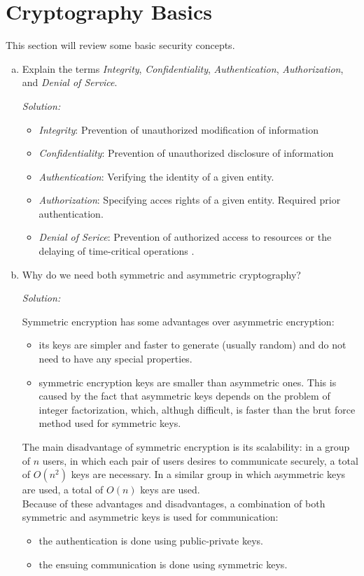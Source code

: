 \documentclass[a4paper,11pt]{article}
\newcommand{\includeonlyinsolution}[1]{\ifsolution#1\fi}
\newenvironment{solution}%
{\par{\noindent\small\textit{Solution:}}\vspace{-12pt}\begin{framed}}%
{\end{framed}\par}
\begin{document}
\section{Cryptography Basics}
This section will review some basic security concepts.
\begin{enumerate}[(a)]
\item Explain the terms \emph{Integrity}, \emph{Confidentiality},
  \emph{Authentication}, \emph{Authorization}, and 
  \emph{Denial of Service}.
\includeonlyinsolution{\begin{solution}
\begin{itemize}
  \item \emph{Integrity}: Prevention of unauthorized modification of information \cite{CompSec}
  \item \emph{Confidentiality}: Prevention of unauthorized disclosure of information \cite{CompSec}
  \item \emph{Authentication}: Verifying the identity of a given entity.
  \item \emph{Authorization}: Specifying acces rights of a given entity. Required prior authentication.
  \item \emph{Denial of Serice}: Prevention of authorized access to resources
  or the delaying of time-critical operations \cite{ISO7498}.
\end{itemize}
\end{solution}}

\item Why do we need both symmetric and
   asymmetric cryptography?
  \includeonlyinsolution{\begin{solution}
  Symmetric encryption has some advantages over asymmetric encryption:
  \begin{itemize}
    \item its keys are simpler and faster to generate (usually random) and do not need to have any special properties.
    \item symmetric encryption keys are smaller than asymmetric ones. This is caused by the fact that
    asymmetric keys depends on the problem of integer factorization, which, althugh difficult, is faster
    than the brut force method used for symmetric keys.
  \end{itemize}
  The main disadvantage of symmetric encryption is its scalability: in a group of $n$ users, in which
  each pair of users desires to communicate securely, a total of $O(n^2)$ keys are necessary. In a
  similar group in which asymmetric keys are used, a total of $O(n)$ keys are used.\\
  Because of these advantages and disadvantages, a combination of both symmetric and asymmetric
  keys is used for communication:
  \begin{itemize}
    \item the authentication is done using public-private keys.
    \item the ensuing communication is done using symmetric keys.
  \end{itemize}
\end{solution}}


\end{enumerate}
\end{document}
